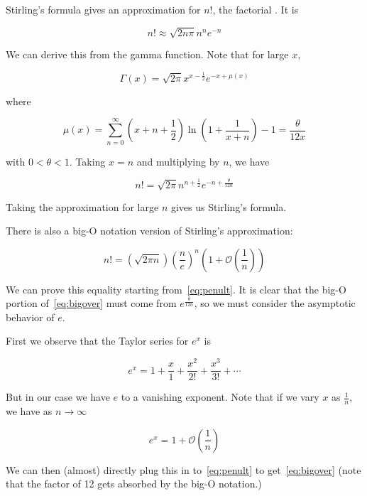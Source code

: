 \documentclass[12pt]{article}
\begin{document}
Stirling's formula gives an approximation for $n!$, the factorial .  It is 

$$ n! \approx \sqrt{2n\pi} n^n e^{-n} $$

We can derive this from the gamma function.  Note that for large $x$, 

\begin{equation}
 \label{eq:glx}
 \Gamma(x) = \sqrt{2\pi}x^{x-\frac{1}{2}} e^{-x + \mu(x)}
\end{equation}

where

$$ \mu(x) = \sum_{n=0}^\infty \left(x+ n +\frac{1}{2}\right) \ln \left(1+ \frac{1}{x+n} \right) -1 = \frac{\theta}{12x} $$

with $0 < \theta < 1$.  Taking $x=n$ and multiplying by $n$, we have

\begin{equation}
\label{eq:penult}
 n! = \sqrt{2\pi} n^{n+\frac{1}{2}} e^{-n + \frac{\theta}{12n}}
\end{equation}

Taking the approximation for large $n$ gives us Stirling's formula.

There is also a big-O notation version of Stirling's approximation:

\begin{equation}
\label{eq:bigover}
n! = \left(\sqrt{2\pi n}\right)\left(\frac{n}{e}\right)^n \left(1+\mathcal{O}\left(\frac{1}{n}\right)\right)
\end{equation}

We can prove this equality starting from~\eqref{eq:penult}.  It is clear that the big-O portion of~\eqref{eq:bigover} must come from $e^{\frac{\theta}{12n}}$, so we must consider the asymptotic behavior of $e$.  

First we observe that the Taylor series for $e^x$ is 

$$ e^x = 1 + \frac{x}{1} + \frac{x^2}{2!} + \frac {x^3}{3!} + \cdots $$

But in our case we have $e$ to a vanishing exponent.   Note that if we vary $x$ as $\frac{1}{n}$, we have as $ n \longrightarrow \infty $

$$ e^x = 1 + \mathcal{O}\left(\frac{1}{n}\right) $$

We can then (almost) directly plug this in to~\eqref{eq:penult} to get~\eqref{eq:bigover} (note that the factor of 12 gets absorbed by the big-O notation.)
\end{document}

